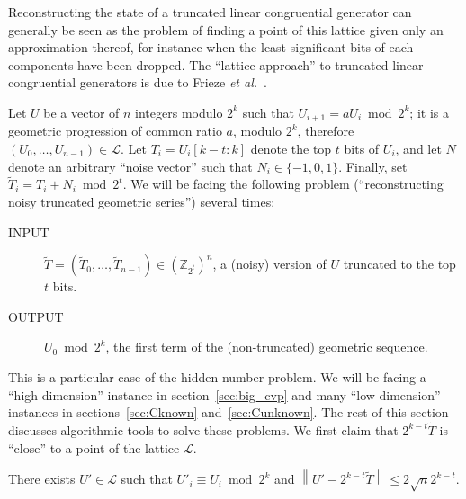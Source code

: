 \documentclass[journal=tosc,final]{iacrtrans}
\begin{document}
Reconstructing the state of a truncated linear congruential generator can
generally be seen as the problem of finding a point of this lattice given only
an approximation thereof, for instance when the least-significant bits of each
components have been dropped. The ``lattice approach'' to truncated linear
congruential generators is due to Frieze \textit{et al.}~\cite{Frieze}.

Let $U$ be a vector of $n$ integers modulo $2^k$ such that
$U_{i+1} = a U_i \bmod 2^k$; it is a geometric progression of common ratio $a$,
modulo $2^k$, therefore $(U_0, \dots, U_{n-1}) \in \mathcal{L}$. Let
$T_i = U_i[k-t:k]$ denote the top $t$ bits of $U_i$, and let $N$ denote an
arbitrary ``noise vector'' such that $N_i \in \{-1, 0, 1\}$. Finally, set
$\widetilde{T}_i = T_i + N_i \bmod 2^{t}$.  We will be facing the following
problem (``reconstructing noisy truncated geometric series'') several times:
\begin{description}
\item[INPUT]  $\widetilde{T} = (\widetilde{T}_0, \dots, \widetilde{T}_{n-1}) \in \left(\mathbb{Z}_{2^t}\right)^n$, a (noisy) version of $U$ truncated to the top $t$ bits.
\item[OUTPUT] $U_0 \bmod 2^k$, the first term of the (non-truncated) geometric sequence.
\end{description}

This is a particular case of the hidden number problem. We will be facing a ``high-dimension'' instance in section~\ref{sec:big_cvp}
and many ``low-dimension'' instances in sections~\ref{sec:Cknown}
and~\ref{sec:Cunknown}. The rest of this section discusses algorithmic tools to
solve these problems. We first claim that $2^{k-t} \widetilde{T}$ is
``close'' to a point of the lattice $\mathcal{L}$.

\begin{lemma}\label{thm:close}
  There exists $U' \in \mathcal{L}$ such that $U'_i \equiv U_i \bmod 2^k$
  and $\left\lVert U' -2^{k-t} \widetilde{T} \right\rVert \leq 2 \sqrt{n} 2^{k-t}$.
\end{lemma}
\end{document}
